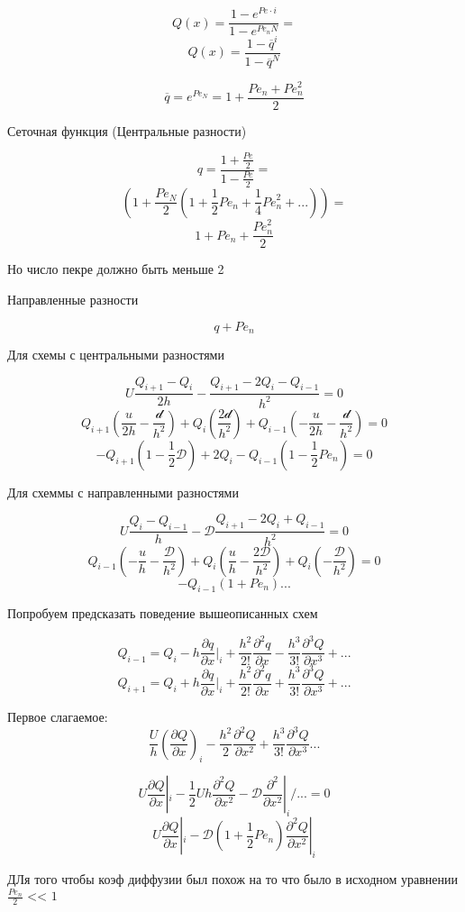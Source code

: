 \documentclass[12pt, a4paper]{article}
\begin{document}
\[ Q(x) = \frac{1-e^{Pe \cdot i}}{1-e^{Pe_n N}}=  \]
\[ Q(x) = \frac{1-\overline{q}^i}{1-\overline{q}^N} \]

\[ \overline{q} = e^{Pe_N} = 1+ \frac{Pe_n + Pe_n^2}{2}\]

Сеточная функция (Центральные разности)

\[ q = \frac{1+ \frac{Pe}{2}}{1- \frac{Pe}{2}} =  \]
\[ (1+ \frac{Pe_N}{2}(1+ \frac{1}{2} {Pe}_n + \frac{1}{4}{Pe}^2_n+...)) =  \]
\[ 1+ {Pe}_n + \frac{{Pe}^2_n}{2} \]

Но число пекре должно быть меньше 2

Направленные разности

\[  q + {Pe}_n \]

Для схемы с центральными разностями

\[ U \frac{Q_{i+1} - Q_i}{2h} - \frac{Q_{i+1} - 2Q_{i} - Q_{i-1}}{h^2} = 0\]
\[ Q_{i+1} (\frac{u}{2h} - \frac{\mathcal{d}}{h^2}) + Q_{i} (\frac{2\mathcal{d}}{h^2}) + Q_{i-1} (-\frac{u}{2h} - \frac{\mathcal{d}}{h^2}) = 0 \]
\[ - Q_{i+1} (1 - \frac{1}{2} \mathcal{D}) + 2Q_{i} - Q_{i-1} (1 - \frac{1}{2} {Pe}_n) = 0 \]

Для схеммы с направленными разностями

\[ U \frac{Q_{i} - Q_{i-1}}{h} - \mathcal{D}\frac{Q_{i+1} - 2Q_{i} + Q_{i-1}}{h^2} = 0\]
\[ Q_{i-1} (-\frac{u}{h}-\frac{\mathcal{D}}{h^2}) + Q_i(\frac{u}{h}-\frac{2\mathcal{D}}{h^2}) + Q_i(-\frac{\mathcal{D}}{h^2}) = 0\]
\[ -Q_{i-1} (1+{Pe}_n) ... \]

Попробуем предсказать поведение вышеописанных схем

\[ Q_{i-1} = Q_i - h \frac{\partial q}{\partial x}|_i + \frac{h^2}{2!} \frac{\partial^2 q }{\partial x} - \frac{h^3}{3!} \frac{\partial^3 Q }{\partial x^3}+... \]
\[ Q_{i+1} = Q_i + h \frac{\partial q}{\partial x}|_i + \frac{h^2}{2!} \frac{\partial^2 q }{\partial x} + \frac{h^3}{3!} \frac{\partial^3 Q }{\partial x^3}+... \]

Первое слагаемое:
\[ \frac{U }{h }{(\frac{\partial Q }{\partial x})}_i - \frac{h^2}{2} \frac{\partial^2 Q }{\partial x^2} + \frac{h^3}{3!} \frac{\partial^3 Q }{\partial x^3} ... \]

\[ U \frac{\partial Q}{\partial x}|_i-\frac{1}{2}Uh \frac{\partial^2Q }{\partial x^2} - \mathcal{D} \frac{\partial^2}{\partial x^2}|_i/... = 0 \]
\[ U \frac{\partial Q}{\partial x}|_i - \mathcal{D}(1+\frac{1}{2} {Pe}_n)\frac{\partial^2 Q }{\partial x^2}|_i \]

ДЛя того чтобы коэф диффузии был похож на то что было в исходном уравнении $ \frac{{Pe}_n}{2} \textrm{ << } 1 $
\end{document}
